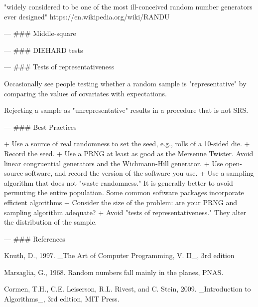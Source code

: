\documentclass[fleqn]{beamer}
\theoremstyle{plain}
\begin{document}
"widely considered to be one of the most ill-conceived random number generators ever designed" https://en.wikipedia.org/wiki/RANDU

---
### Middle-square

---
### DIEHARD tests

---
### Tests of representativeness

Occasionally see people testing whether a random sample is "representative" by
comparing the values of covariates with expectations.

Rejecting a sample as "unrepresentative" results in a procedure that is not SRS.

---
### Best Practices

+ Use a source of real randomness to set the seed, e.g., rolls of a 10-sided die.
+ Record the seed.
+ Use a PRNG at least as good as the Mersenne Twister. 
Avoid linear congruential generators and the Wichmann-Hill generator.
+ Use open-source software, and record the version of the software you use.
+ Use a sampling algorithm that does not "waste randomness." 
It is generally better to avoid permuting the entire population.
Some common software packages incorporate efficient algorithms
+ Consider the size of the problem: are your PRNG and sampling algorithm adequate?
+ Avoid "tests of representativeness." They alter the distribution of the sample.

---
### References

Knuth, D., 1997. _The Art of Computer Programming, V. II_, 3rd edition

Marsaglia, G., 1968. Random numbers fall mainly in the planes, PNAS.

Cormen, T.H., C.E. Leiserson, R.L. Rivest, and C. Stein, 2009. 
_Introduction to Algorithms_, 3rd edition, MIT Press.
\end{document}
